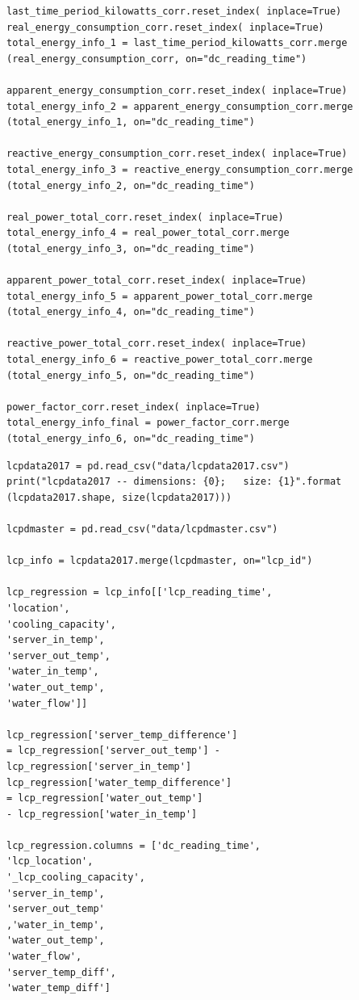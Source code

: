 \documentclass[12pt]{scrartcl}
\begin{document}
\begin{lstlisting}[frame=single,basicstyle=\footnotesize\ttfamily,
  caption={Python - Merge Energy Pivot Tables together},label={list:[Merge Pivot Tables together]}]
last_time_period_kilowatts_corr.reset_index( inplace=True)
real_energy_consumption_corr.reset_index( inplace=True)
total_energy_info_1 = last_time_period_kilowatts_corr.merge
(real_energy_consumption_corr, on="dc_reading_time")

apparent_energy_consumption_corr.reset_index( inplace=True)
total_energy_info_2 = apparent_energy_consumption_corr.merge
(total_energy_info_1, on="dc_reading_time")

reactive_energy_consumption_corr.reset_index( inplace=True)
total_energy_info_3 = reactive_energy_consumption_corr.merge
(total_energy_info_2, on="dc_reading_time")

real_power_total_corr.reset_index( inplace=True)
total_energy_info_4 = real_power_total_corr.merge
(total_energy_info_3, on="dc_reading_time")

apparent_power_total_corr.reset_index( inplace=True)
total_energy_info_5 = apparent_power_total_corr.merge
(total_energy_info_4, on="dc_reading_time")

reactive_power_total_corr.reset_index( inplace=True)
total_energy_info_6 = reactive_power_total_corr.merge
(total_energy_info_5, on="dc_reading_time")

power_factor_corr.reset_index( inplace=True)
total_energy_info_final = power_factor_corr.merge
(total_energy_info_6, on="dc_reading_time")

\end{lstlisting}

\begin{lstlisting}[frame=single,basicstyle=\footnotesize\ttfamily,
  caption={Python - Import and Merge LCP Data},label={list:[Import and Merge LCP Data]}]
lcpdata2017 = pd.read_csv("data/lcpdata2017.csv")
print("lcpdata2017 -- dimensions: {0};   size: {1}".format
(lcpdata2017.shape, size(lcpdata2017)))

lcpdmaster = pd.read_csv("data/lcpdmaster.csv")

lcp_info = lcpdata2017.merge(lcpdmaster, on="lcp_id")

lcp_regression = lcp_info[['lcp_reading_time',
'location',
'cooling_capacity',
'server_in_temp',
'server_out_temp',
'water_in_temp',
'water_out_temp',
'water_flow']]

lcp_regression['server_temp_difference'] 
= lcp_regression['server_out_temp'] - 
lcp_regression['server_in_temp']
lcp_regression['water_temp_difference'] 
= lcp_regression['water_out_temp'] 
- lcp_regression['water_in_temp']

lcp_regression.columns = ['dc_reading_time',
'lcp_location',
'_lcp_cooling_capacity',
'server_in_temp',
'server_out_temp'
,'water_in_temp',
'water_out_temp',
'water_flow',
'server_temp_diff',
'water_temp_diff']


\end{lstlisting}
\end{document}
